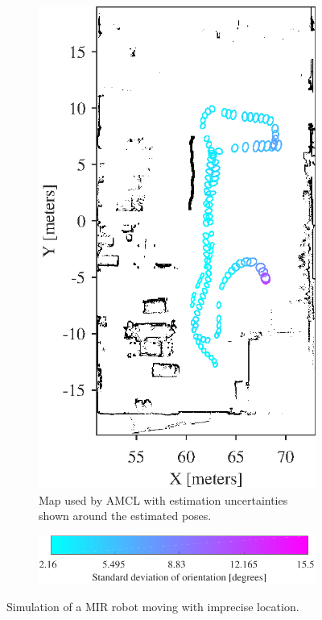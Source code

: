 \begin{figure}[htbp]
\begin{subfigure}[t]{0.4\textwidth}
		\includegraphics[width=\textwidth]{figures/static_mapping/simulation_poses_amcl_map}
		\caption{Map used by AMCL with estimation uncertainties shown around the estimated poses.}
		\label{fig:simulated_small_amcl_map}
	\end{subfigure}
   	\begin{subfigure}[t]{1\textwidth}
        \centering
        \includegraphics[scale=1.0]{figures/static_mapping/simulation_poses_amcl_map_bar-crop}
    \end{subfigure}
	\caption{Simulation of a MIR robot moving with imprecise location.}
	\label{fig:test_map_setup}
\end{figure}


